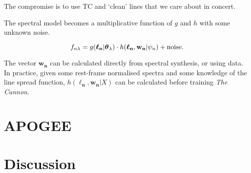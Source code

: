 \documentclass[useAMS,usenatbib]{mn2e}
\newcommand\tc{\textit{The Cannon}}
\newcommand\lv{\mathbf{\boldsymbol\ell_n}}
\newcommand\cv{{\boldsymbol\theta}_\lambda}
\newcommand\wv{\mathbf{w_n}}
\newcommand\given{|}
\begin{document}
The compromise is to use TC and `clean' lines that we care about in concert.

The spectral model becomes a multiplicative function of $g$ and $h$ with some
unknown noise.

\begin{equation}
    f_{n\lambda} = g(\lv\given\cv) \cdot h(\lv,\wv\given\psi_n) +  {\rm noise}.
\end{equation}

The vector $\wv$ can be calculated directly from spectral synthesis, or using data.
In practice, given some rest-frame normalised spectra and some knowledge of the
line spread function, $h(\lv,\wv\given{}X)$ can be calculated before training \tc.







\section{APOGEE}





\section{Discussion}



\end{document}
